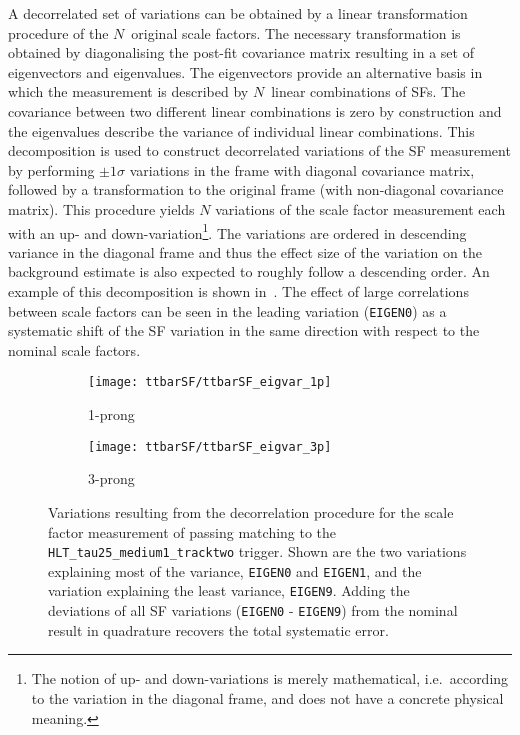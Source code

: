 A decorrelated set of variations can be obtained by a linear
transformation procedure of the $N$~original scale factors. The
necessary transformation is obtained by diagonalising the post-fit
covariance matrix resulting in a set of eigenvectors and
eigenvalues. The eigenvectors provide an alternative basis in which
the measurement is described by $N$~linear combinations of SFs. The
covariance between two different linear combinations is zero by
construction and the eigenvalues describe the variance of individual
linear combinations. This decomposition is used to construct
decorrelated variations of the SF measurement by performing
$\pm 1 \sigma$ variations in the frame with diagonal covariance
matrix, followed by a transformation to the original frame (with
non-diagonal covariance matrix). This procedure yields $N$ variations
of the scale factor measurement each with an up- and
down-variation\footnote{The notion of up- and down-variations is
  merely mathematical, i.e.\ according to the variation in the
  diagonal frame, and does not have a concrete physical meaning.}. The
variations are ordered in descending variance in the diagonal frame
and thus the effect size of the variation on the background estimate
is also expected to roughly follow a descending order. An example of this
decomposition is shown in~. The
effect of large correlations between scale factors can be seen in the
leading variation (\texttt{EIGEN0}) as a systematic shift of the SF
variation in the same direction with respect to the nominal scale
factors.

\begin{figure}[htbp]
  \centering

  \begin{subfigure}[t]{.495\textwidth}
    \texttt{[image: ttbarSF/ttbarSF\_eigvar\_1p]}
    \caption{1-prong \tauhadvis}
    \label{fig:ttbarSF_eigenvariations_1p}
  \end{subfigure}\hfill%
  \begin{subfigure}[t]{.495\textwidth}
    \texttt{[image: ttbarSF/ttbarSF\_eigvar\_3p]}
    \caption{3-prong \tauhadvis}
    \label{fig:ttbarSF_eigenvariations_3p}
  \end{subfigure}

  \caption{Variations resulting from the decorrelation procedure for
    the scale factor measurement of \tauhadvis passing matching to the
    \texttt{HLT\_tau25\_medium1\_tracktwo} trigger. Shown are the two
    variations explaining most of the variance, \texttt{EIGEN0} and
    \texttt{EIGEN1}, and the variation explaining the least variance,
    \texttt{EIGEN9}. Adding the deviations of all SF variations
    (\texttt{EIGEN0} - \texttt{EIGEN9}) from the nominal result in
    quadrature recovers the total systematic error.}
  \label{fig:ttbarSF_eigenvariations}
\end{figure}


